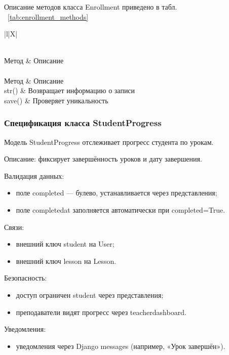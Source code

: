 Описание методов класса Enrollment приведено в табл. ~\ref {tab:enrollment_methods}

\begin{xltabular}{\textwidth}{|l|X|}
	\caption{Методы класса Enrollment\label{tab:enrollment_methods}}\\
	\hline
	Метод & Описание \\ \hline
	\endfirsthead
	\\
	\hline
	Метод & Описание \\ \hline
	\endhead
	str() & Возвращает информацию о записи \\ \hline
	save() & Проверяет уникальность \\ \hline
\end{xltabular}

\subsubsection{Спецификация класса StudentProgress}

Модель StudentProgress отслеживает прогресс студента по урокам.


Описание: фиксирует завершённость уроков и дату завершения.

Валидация данных:
	\begin{itemize}
		\item поле completed — булево, устанавливается через представления;
		\item поле completedat заполняется автоматически при completed=True.
	\end{itemize}
	
Связи:
	\begin{itemize}
		\item внешний ключ student на User;
		\item внешний ключ lesson на Lesson.
	\end{itemize}
	
Безопасность:
	\begin{itemize}
		\item доступ ограничен student через представления;
		\item преподаватели видят прогресс через teacherdashboard.
	\end{itemize}
	
Уведомления:
	\begin{itemize}
		\item уведомления через Django messages (например, «Урок завершён»).
	\end{itemize}
	
